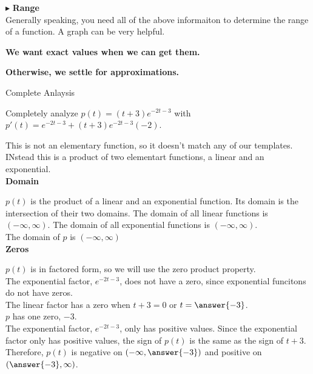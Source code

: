 \documentclass{ximera}
\begin{document}
$\blacktriangleright$ \textbf{\textcolor{red!10!blue!90!}{Range}}   \\
Generally speaking, you need all of the above informaiton to determine the range of a function.  A graph can be very helpful. \\



\begin{center}
\textbf{\textcolor{red!70!black}{We want exact values when we can get them.}}

\textbf{\textcolor{red!70!black}{Otherwise, we settle for approximations.}}
\end{center}








\begin{example} Complete Anlaysis

Completely analyze $p(t) = (t+3)e^{-2t-3}$ with $p'(t) = e^{-2t-3} + (t+3) e^{-2t-3} (-2)$.


This is not an elementary function, so it doesn't match any of our templates. INstead this is a product of two elementart functions, a linear and an exponential. \\



\textbf{Domain}

$p(t)$ is the product of a linear and an exponential function. Its domain is the intersection of their two domains. The domain of all linear functions is $(-\infty, \infty)$. The domain of all exponential functions is $(-\infty, \infty)$. \\

The domain of $p$ is $(-\infty, \infty)$\.\\



\textbf{Zeros}

$p(t)$ is in factored form, so we will use the zero product property. \\
The exponential factor, $e^{-2t-3}$, does not have a zero, since exponential funcitons do not have zeros. \\  
The linear factor has a zero when $t+3=0$ or $t=\answer{-3}$.  \\


$p$ has one zero, $-3$. \\



The exponential factor, $e^{-2t-3}$, only has positive values.   Since the exponential factor only has positive values, the sign of $p(t)$ is the same as the sign of $t+3$.  Therefore, $p(t)$ is negative on $\left( -\infty, \answer{-3} \right)$ and positive on $\left( \answer{-3}, \infty \right)$.  






\end{example}
\end{document}
